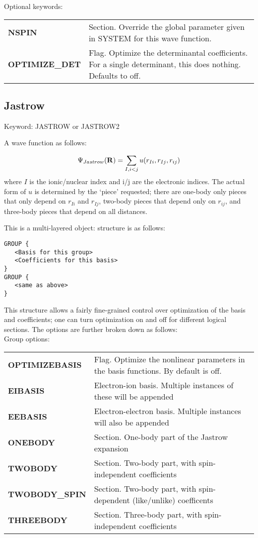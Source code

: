 \documentclass[12pt]{article}
\newcommand{\bR}{{\bf R}}
\begin{document}
Optional keywords: \\
\begin{tabular}{lp{12cm}}
{\bf NSPIN } & Section. Override the global parameter given in SYSTEM for this wave function. \\
{\bf OPTIMIZE\_DET} & Flag.  Optimize the determinantal coefficients.  For a single 
determinant, this does nothing. Defaults to off.\\
\end{tabular}


\subsection{Jastrow}
Keyword: JASTROW or JASTROW2

A wave function as follows:

\begin{equation} 
\Psi_{Jastrow}(\bR)=\sum_{I,i<j} u(r_{Ii},r_{Ij}, r_{ij})
\end{equation}
where $I$ is the ionic/nuclear index and i/j are the electronic indices.  The actual form of $u$
is determined by the `piece' requested; there are one-body only pieces that only depend on $r_{Ii}$ and 
$r_{Ij}$, two-body pieces that depend only on $r_{ij}$, and three-body pieces that depend on all 
distances.

This is a multi-layered object: structure is as follows:
\begin{verbatim}
GROUP { 
   <Basis for this group>
   <Coefficients for this basis>
}
GROUP { 
   <same as above>
}
\end{verbatim}
This structure allows a fairly fine-grained control over optimization of the basis and coefficients; 
one can turn optimization on and off for different logical sections.  The options are further broken
down as follows: \\

Group options: \\
\begin{tabular}{lp{12cm}}
{\bf OPTIMIZEBASIS } & Flag. Optimize the nonlinear parameters in the basis functions. By default is off. \\
{\bf EIBASIS } & Electron-ion basis.  Multiple instances of these will be appended \\
{\bf EEBASIS } & Electron-electron basis.  Multiple instances will also be appended \\
{\bf ONEBODY } & Section. One-body part of the Jastrow expansion \\
{\bf TWOBODY } & Section. Two-body part, with spin-independent coefficients \\
{\bf TWOBODY\_SPIN } & Section. Two-body part, with spin-dependent (like/unlike) coefficents \\
{\bf THREEBODY } & Section. Three-body part, with spin-independent coefficients \\
\end{tabular}
\end{document}
